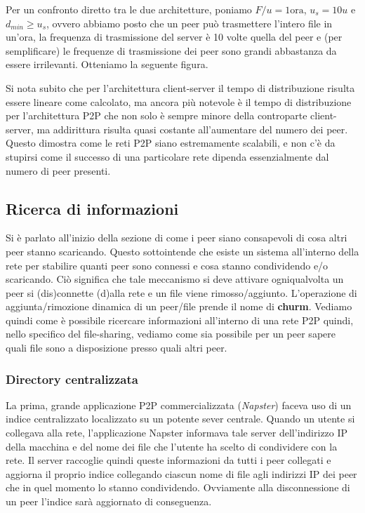 Per un confronto diretto tra le due architetture, poniamo $F/u = 1 \text{ora}$, $u_s = 10u$ e $d_{min} \geq u_s$, ovvero abbiamo posto che un peer può trasmettere l'intero file in un'ora, la frequenza di trasmissione del server è 10 volte quella del peer e (per semplificare) le frequenze di trasmissione dei peer sono grandi abbastanza da essere irrilevanti. Otteniamo la seguente figura.


Si nota subito che per l'architettura client-server il tempo di distribuzione risulta essere lineare come calcolato, ma ancora più notevole è il tempo di distribuzione per l'architettura P2P che non solo è sempre minore della controparte client-server, ma addirittura risulta quasi costante all'aumentare del numero dei peer. Questo dimostra come le reti P2P siano estremamente scalabili, e non c'è da stupirsi come il successo di una particolare rete dipenda essenzialmente dal numero di peer presenti. %

\subsection{Ricerca di informazioni}\label{ricerca-di-informazioni}

Si è parlato all'inizio della sezione di come i peer siano consapevoli di cosa altri peer stanno scaricando. Questo sottointende che esiste un sistema all'interno della rete per stabilire quanti peer sono connessi e cosa stanno condividendo e/o scaricando. Ciò significa che tale meccanismo si deve attivare ogniqualvolta un peer si (dis)connette (d)alla rete e un file viene rimosso/aggiunto. L'operazione di aggiunta/rimozione dinamica di un peer/file prende il nome di \textbf{churm}. Vediamo quindi come è possibile ricercare informazioni all'interno di una rete P2P quindi, nello specifico del file-sharing, vediamo come sia possibile per un peer sapere quali file sono a disposizione presso quali altri peer.

\subsubsection{Directory centralizzata}\label{directory-centralizzata}

La prima, grande applicazione P2P commercializzata (\emph{Napster}) faceva uso di un indice centralizzato localizzato su un potente sever centrale. Quando un utente si collegava alla rete, l'applicazione Napster informava tale server dell'indirizzo IP della macchina e del nome dei file che l'utente ha scelto di condividere con la rete. Il server raccoglie quindi queste informazioni da tutti i peer collegati e aggiorna il proprio indice collegando ciascun nome di file agli indirizzi IP dei peer che in quel momento lo stanno condividendo. Ovviamente alla disconnessione di un peer l'indice sarà aggiornato di conseguenza.

